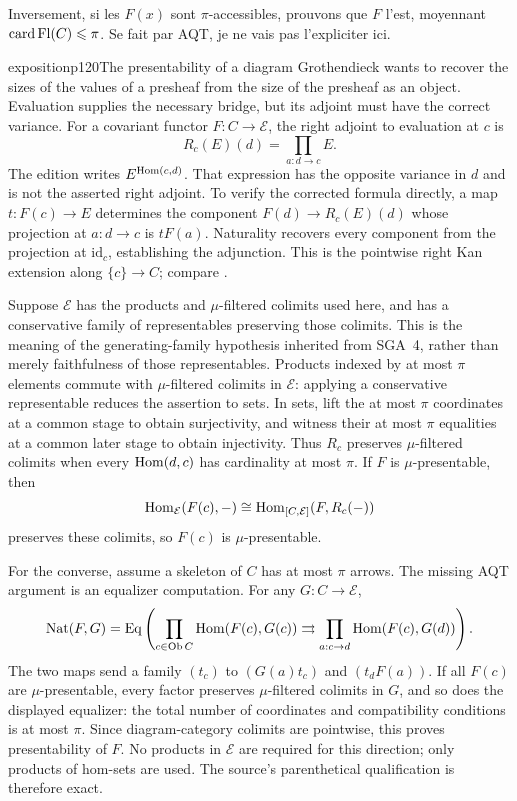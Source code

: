 Inversement, si les $F(x)$ sont $\pi$-accessibles, prouvons que $F$ l'est, moyennant $\operatorname{card} \operatorname{Fl}(C) \leqslant \pi$. Se fait par AQT, je ne vais pas l'expliciter ici.


\begin{dcomment}{exposition}{p120}{The presentability of a diagram}
Grothendieck wants to recover the sizes of the values of a presheaf from the size of the presheaf as an object. Evaluation supplies the necessary bridge, but its adjoint must have the correct variance. For a covariant functor $F:C\to\mathcal E$, the right adjoint to evaluation at $c$ is
\[
 R_c(E)(d)=\prod_{a:d\to c}E.
\]
The edition writes $E^{\mathrm{Hom}(c,d)}$. That expression has the opposite variance in $d$ and is not the asserted right adjoint. To verify the corrected formula directly, a map $t:F(c)\to E$ determines the component $F(d)\to R_c(E)(d)$ whose projection at $a:d\to c$ is $tF(a)$. Naturality recovers every component from the projection at $\mathrm{id}_c$, establishing the adjunction. This is the pointwise right Kan extension along $\{c\}\to C$; compare \citet[Proposition 6.1.5 and Theorem 6.2.1]{Riehl2016}.

Suppose $\mathcal E$ has the products and $\mu$-filtered colimits used here, and has a conservative family of representables preserving those colimits. This is the meaning of the generating-family hypothesis inherited from SGA~4, rather than merely faithfulness of those representables. Products indexed by at most $\pi$ elements commute with $\mu$-filtered colimits in $\mathcal E$: applying a conservative representable reduces the assertion to sets. In sets, lift the at most $\pi$ coordinates at a common stage to obtain surjectivity, and witness their at most $\pi$ equalities at a common later stage to obtain injectivity. Thus $R_c$ preserves $\mu$-filtered colimits when every $\mathrm{Hom}(d,c)$ has cardinality at most $\pi$. If $F$ is $\mu$-presentable, then
\[
 \mathrm{Hom}_{\mathcal E}(F(c),-)
   \cong\mathrm{Hom}_{[C,\mathcal E]}(F,R_c(-))
\]
preserves these colimits, so $F(c)$ is $\mu$-presentable.

For the converse, assume a skeleton of $C$ has at most $\pi$ arrows. The missing AQT argument is an equalizer computation. For any $G:C\to\mathcal E$,
\[
 \operatorname{Nat}(F,G)=
 \operatorname{Eq}\left(
 \prod_{c\in\mathrm{Ob}\, C}\mathrm{Hom}(F(c),G(c))
 \rightrightarrows
 \prod_{a:c\to d}\mathrm{Hom}(F(c),G(d))\right).
\]
The two maps send a family $(t_c)$ to $(G(a)t_c)$ and $(t_dF(a))$. If all $F(c)$ are $\mu$-presentable, every factor preserves $\mu$-filtered colimits in $G$, and so does the displayed equalizer: the total number of coordinates and compatibility conditions is at most $\pi$. Since diagram-category colimits are pointwise, this proves presentability of $F$. No products in $\mathcal E$ are required for this direction; only products of hom-sets are used. The source's parenthetical qualification is therefore exact.


\end{dcomment}
